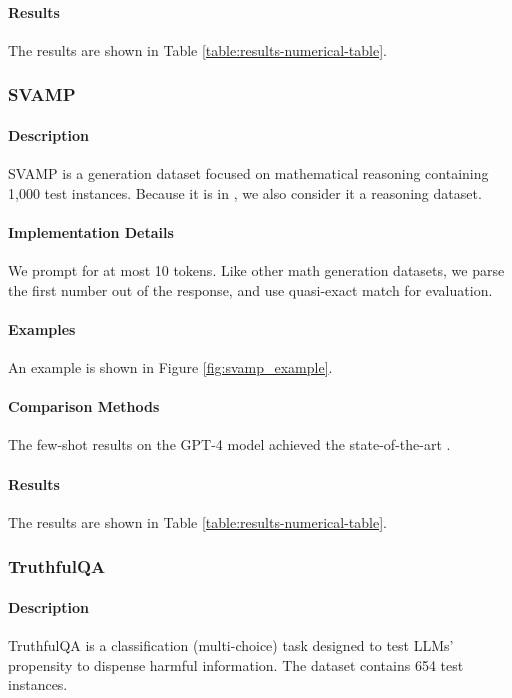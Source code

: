 \paragraph{Results} The results are shown in Table \ref{table:results-numerical-table}.

\subsubsection{SVAMP}
\paragraph{Description} SVAMP \citep{patel2021nlp} is a generation dataset focused on mathematical reasoning containing 1,000 test instances. Because it is in \citet{kojima2023large}, we also consider it a reasoning dataset.

\paragraph{Implementation Details}
 We prompt for at most 10 tokens. Like other math generation datasets, we parse the first number out of the response, and use quasi-exact match for evaluation. 

\paragraph{Examples} An example is shown in Figure \ref{fig:svamp_example}.

\paragraph{Comparison Methods}
The few-shot results on the GPT-4 model achieved the state-of-the-art \citep{zhao2023automatic}.

\paragraph{Results} The results are shown in Table \ref{table:results-numerical-table}.

\subsubsection{TruthfulQA}
\paragraph{Description} TruthfulQA \citep{lin-etal-2022-truthfulqa} is a classification (multi-choice) task designed to test LLMs' propensity to dispense harmful information. The dataset contains 654 test instances.

